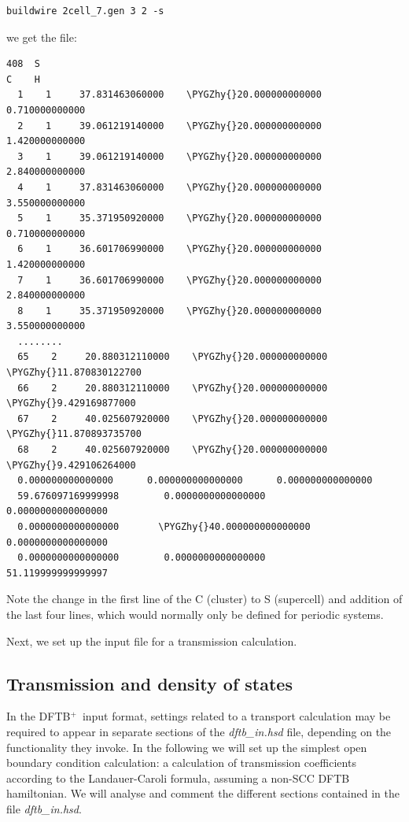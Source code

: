 \documentclass[a4paper,11pt,english]{sphinxmanual}
\newcommand{\dftbp}{\textsf{DFTB$^{\text{+}}$\ }} %
\def\PYGZhy{\char`\-}
\begin{document}
{{\begin{Verbatim}[commandchars=\\\{\}]
  buildwire 2cell_7.gen 3 2 -s
\end{Verbatim}
%
we get the file:
%
\begin{Verbatim}[commandchars=\\\{\}]
408  S
C    H
  1    1     37.831463060000    \PYGZhy{}20.000000000000      0.710000000000
  2    1     39.061219140000    \PYGZhy{}20.000000000000      1.420000000000
  3    1     39.061219140000    \PYGZhy{}20.000000000000      2.840000000000
  4    1     37.831463060000    \PYGZhy{}20.000000000000      3.550000000000
  5    1     35.371950920000    \PYGZhy{}20.000000000000      0.710000000000
  6    1     36.601706990000    \PYGZhy{}20.000000000000      1.420000000000
  7    1     36.601706990000    \PYGZhy{}20.000000000000      2.840000000000
  8    1     35.371950920000    \PYGZhy{}20.000000000000      3.550000000000
  ........
  65    2     20.880312110000    \PYGZhy{}20.000000000000    \PYGZhy{}11.870830122700
  66    2     20.880312110000    \PYGZhy{}20.000000000000     \PYGZhy{}9.429169877000
  67    2     40.025607920000    \PYGZhy{}20.000000000000    \PYGZhy{}11.870893735700
  68    2     40.025607920000    \PYGZhy{}20.000000000000     \PYGZhy{}9.429106264000
  0.000000000000000      0.000000000000000      0.000000000000000
  59.676097169999998        0.0000000000000000        0.0000000000000000
  0.0000000000000000       \PYGZhy{}40.000000000000000        0.0000000000000000
  0.0000000000000000        0.0000000000000000        51.119999999999997
\end{Verbatim}
%
Note the change in the first line of the C (cluster) to S (supercell) and
addition of the last four lines, which would normally only be defined for periodic systems.

Next, we set up the input file for a transmission calculation.

\subsection{Transmission and density of states}
\label{transport:transmission-and-density-of-states}
In the \dftbp input format, settings related to a transport
calculation may be required to appear in separate sections of the
\emph{dftb\_in.hsd} file, depending on the functionality they invoke. In the
following we will set up the simplest open boundary condition
calculation: a calculation of transmission coefficients according to
the Landauer-Caroli formula, assuming a non-SCC DFTB hamiltonian. We
will analyse and comment the different sections contained in the file
\emph{dftb\_in.hsd}.

}}
\end{document}
